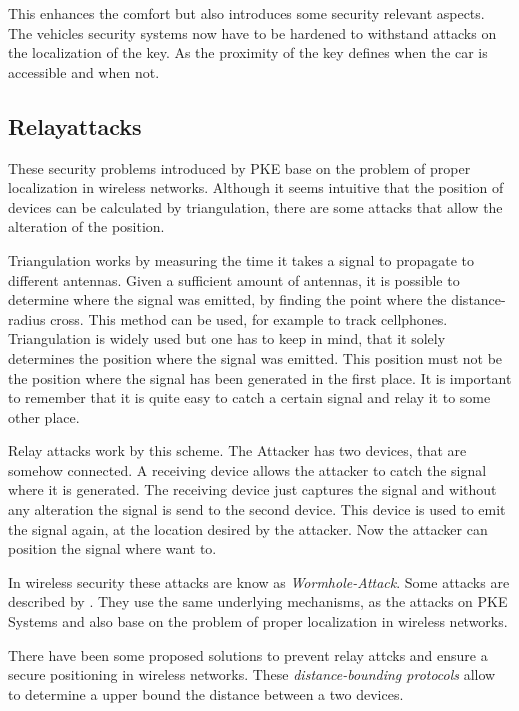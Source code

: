 	This enhances the comfort but also introduces some security relevant aspects.
	The vehicles security systems now have to be hardened
	to withstand attacks on the localization of the key.
	As the proximity of the key defines when the car is accessible and when not. 

\subsection*{Relayattacks}
	These security problems introduced by PKE base on the problem of proper
	localization in wireless networks.
	Although it seems intuitive that the position of devices can be calculated by
	triangulation, there are some attacks that allow the alteration of the position.

	Triangulation works by measuring the time it takes a signal to propagate
	to different antennas.
	Given a sufficient amount of antennas,
	it is possible to determine where the signal was emitted,
	by finding the point where the distance-radius cross. 				%
	This method can be used,
	for example to track cellphones.	%
	Triangulation is widely used but one has to keep in mind,
	that it solely determines the position where the signal was emitted.
	This position must not be the position where the signal has been generated in the first place.
	It is important to remember that it is quite easy to catch
	a certain signal and relay it to some other place.

	Relay attacks work by this scheme.
	The Attacker has two devices,
	that are somehow connected.
	A receiving device allows the attacker to catch the signal where it is generated.
	The receiving device just captures the signal and
	without any alteration the signal is send to the second device.
	This device is used to emit the signal again,
	at the location desired by the attacker.
	Now the attacker can position the signal where want to.

	In wireless security these attacks are know as \textsl{Wormhole-Attack}.
	Some attacks are described by \citeauthor{wormhole}.	%
	They use the same underlying mechanisms, as the attacks on PKE Systems
	and also base on the problem of proper localization in wireless networks.

	There have been some proposed solutions to prevent relay attcks and
	ensure a secure positioning in wireless networks.
	These \textsl{distance-bounding protocols} allow to determine a upper
	bound the distance between a two devices.
